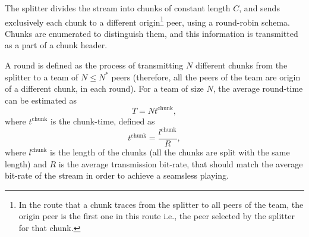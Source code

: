 

\label{sec:feeding_the_team}

The splitter divides the stream into chunks of constant length $C$,
and sends exclusively each chunk to a different
\gls{origin}\footnote{In the route that a chunk traces from the
  splitter to all peers of the team, the origin peer is the first one
  in this route i.e., the peer selected by the splitter for that
  chunk.}  peer, using a round-robin schema. Chunks are enumerated to
distinguish them, and this information is transmitted as a part of a chunk
header.

\begin{comment}
More details about the implementation
are available in Fig.~\ref{fig:chunk_generation}.


\begin{figure*}
  \fig{500}{5cm}{DBS_splitter_feed} \caption{Chunk
    generation at the splitter and their transmission to the
    team.\label{fig:chunk_generation}}
\end{figure*}
\end{comment}

A \gls{round} is defined as the process of transmitting $N$ different
chunks from the splitter to a team of $N\leq N^*$ peers (therefore,
all the peers of the team are origin of a different chunk, in each
round). For a team of size $N$, the average \gls{round-time} can be
estimated as
\begin{equation}
  T=Nt^{\mathrm{chunk}},
\end{equation}
where $t^{\mathrm{chunk}}$ is the \gls{chunk-time}, defined as
\begin{equation}
  \label{eq:chunk_time}
  t^{\mathrm{chunk}}=\frac{l^{\mathrm{chunk}}}{R},
\end{equation}
where $l^{\mathrm{chunk}}$ is the length of the chunks (all the chunks are
split with the same length) and $R$ is the average transmission
bit-rate, that should match the average bit-rate of the stream in
order to achieve a seamsless playing.

\begin{comment}
The round-time is defined by:
\begin{equation}
  \cal{r} = \cal{c}N.
  \label{eq:round_time}
\end{equation}
For example, if we use only one team of $N=256$ peers, a chunk size
$C=1024$~bytes, and a video of $1$~Mb/s, the round time is
\begin{displaymath}
  \cal{r} = \frac{1024\frac{\text{bytes}}{\text{chunk}}\times
    8\frac{\text{bits}}{\text{byte}}}{10^6\frac{\text{bits}}{\text{second}}}\times
  256 \approx 2.1~\text{seconds}.
\end{displaymath}
\end{comment}
